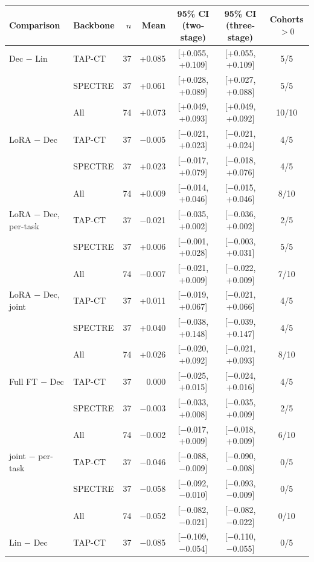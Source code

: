 \begin{tabular}{@{}llrrccc@{}}
\toprule
Comparison & Backbone & $n$ & Mean & 95\% CI (two-stage) & 95\% CI (three-stage) & Cohorts $>0$ \\
\midrule
Dec $-$ Lin & TAP-CT & 37 & +0.085 & [+0.055, +0.109] & [+0.055, +0.109] & 5/5 \\
 & SPECTRE & 37 & +0.061 & [+0.028, +0.089] & [+0.027, +0.088] & 5/5 \\
 & All & 74 & +0.073 & [+0.049, +0.093] & [+0.049, +0.092] & 10/10 \\
\addlinespace[2pt]
LoRA $-$ Dec & TAP-CT & 37 & $-$0.005 & [$-$0.021, +0.023] & [$-$0.021, +0.024] & 4/5 \\
 & SPECTRE & 37 & +0.023 & [$-$0.017, +0.079] & [$-$0.018, +0.076] & 4/5 \\
 & All & 74 & +0.009 & [$-$0.014, +0.046] & [$-$0.015, +0.046] & 8/10 \\
\addlinespace[2pt]
LoRA $-$ Dec, per-task & TAP-CT & 37 & $-$0.021 & [$-$0.035, +0.002] & [$-$0.036, +0.002] & 2/5 \\
 & SPECTRE & 37 & +0.006 & [$-$0.001, +0.028] & [$-$0.003, +0.031] & 5/5 \\
 & All & 74 & $-$0.007 & [$-$0.021, +0.009] & [$-$0.022, +0.009] & 7/10 \\
\addlinespace[2pt]
LoRA $-$ Dec, joint & TAP-CT & 37 & +0.011 & [$-$0.019, +0.067] & [$-$0.021, +0.066] & 4/5 \\
 & SPECTRE & 37 & +0.040 & [$-$0.038, +0.148] & [$-$0.039, +0.147] & 4/5 \\
 & All & 74 & +0.026 & [$-$0.020, +0.092] & [$-$0.021, +0.093] & 8/10 \\
\addlinespace[2pt]
Full FT $-$ Dec & TAP-CT & 37 & 0.000 & [$-$0.025, +0.015] & [$-$0.024, +0.016] & 4/5 \\
 & SPECTRE & 37 & $-$0.003 & [$-$0.033, +0.008] & [$-$0.035, +0.009] & 2/5 \\
 & All & 74 & $-$0.002 & [$-$0.017, +0.009] & [$-$0.018, +0.009] & 6/10 \\
\addlinespace[2pt]
joint $-$ per-task & TAP-CT & 37 & $-$0.046 & [$-$0.088, $-$0.009] & [$-$0.090, $-$0.008] & 0/5 \\
 & SPECTRE & 37 & $-$0.058 & [$-$0.092, $-$0.010] & [$-$0.093, $-$0.009] & 0/5 \\
 & All & 74 & $-$0.052 & [$-$0.082, $-$0.021] & [$-$0.082, $-$0.022] & 0/10 \\
\addlinespace[2pt]
Lin $-$ Dec & TAP-CT & 37 & $-$0.085 & [$-$0.109, $-$0.054] & [$-$0.110, $-$0.055] & 0/5 \\

\end{tabular}
